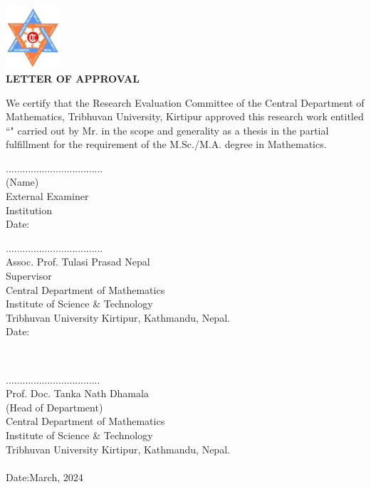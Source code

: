 
 \begin{center}
 	\includegraphics[width=0.15\textwidth]{pictures/tulogo.png}\\[1.5cm]
 {\Large{\bfseries{LETTER OF APPROVAL}}}\\[.5cm]
\end{center}

\noindent
We certify that the Research Evaluation Committee of the Central Department of Mathematics, Tribhuvan University, Kirtipur approved this research work entitled ``\textbf{\thetitle}" carried out by Mr. \textbf{\theauthor} in the scope and generality as a thesis in the partial fulfillment for the requirement of the M.Sc./M.A. degree in Mathematics.
\\[3.5cm]
\begin{minipage}{0.45\textwidth}
		...................................\\
		(Name) \\
		External Examiner\\
		Institution \\[0.1cm]
		Date:
\end{minipage}
%
\begin{minipage}{0.6\textwidth}
	...................................\\
		Assoc. Prof. Tulasi Prasad Nepal \\
		Supervisor \\
		Central Department of Mathematics\\
                Institute of Science \& Technology\\
                Tribhuvan University
                Kirtipur, Kathmandu, Nepal.\\[0.1cm]
		Date:

\end{minipage}\\[3cm]

\begin{center}
..................................\\
Prof. Doc. Tanka Nath Dhamala\\
	(Head of Department)\\
 Central Department of Mathematics\\
	 Institute of Science \& Technology\\
	 Tribhuvan University
	  Kirtipur, Kathmandu, Nepal.\\ \\
	Date:March, 2024
\end{center}
